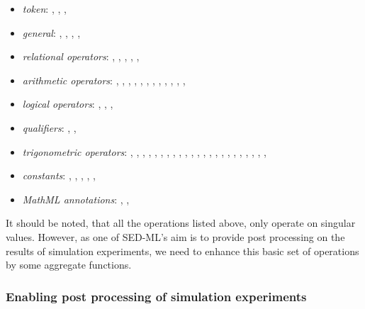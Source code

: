 \begin{itemize}\setlength{\parskip}{-0.1ex}

\item \emph{token}: , , ,
  
\item \emph{general}: , ,
  , ,  

\item \emph{relational operators}: , ,
  , , , 

\item \emph{arithmetic operators}: , ,
  , , , ,
  , , , ,
  , , 

\item \emph{logical operators}: , ,
  , 

\item \emph{qualifiers}: , ,

\item \emph{trigonometric operators}: , ,
  , , , ,
  , , , ,
  , , , ,
  , , , ,
  , , ,
  , , 

\item \emph{constants}: , ,
  , , ,

\item \emph{MathML annotations}: ,
  , 

\end{itemize}

It should be noted, that all the operations listed above, only operate on 
singular values. However, as one of SED-ML's aim is to provide post processing 
on the results of simulation experiments, we need to enhance this basic set of 
operations by some aggregate functions. 

\subsubsection{Enabling post processing of simulation experiments}

